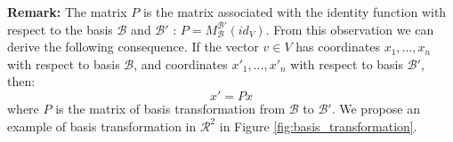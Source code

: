 
\textbf{Remark:} The matrix $P$ is the matrix associated with the identity function with respect to the basis $\mathcal{B}$ and $\mathcal{B}'$ : $P = M^{\mathcal{B}'}_{\mathcal{B}}(id_V)$. From this observation we can derive the following consequence. If the vector $v \in V$ has coordinates $x_1,...,x_n$ with respect to basis $\mathcal{B}$, and coordinates $x'_1,...,x'_n$ with respect to basis $\mathcal{B}'$, then:
\begin{equation}
    x' = Px
\end{equation}
where $P$ is the matrix of basis transformation from $\mathcal{B}$ to $\mathcal{B}'$. We propose an example of basis transformation in $\mathcal{R}^2$ in Figure \ref{fig:basis_transformation}.

